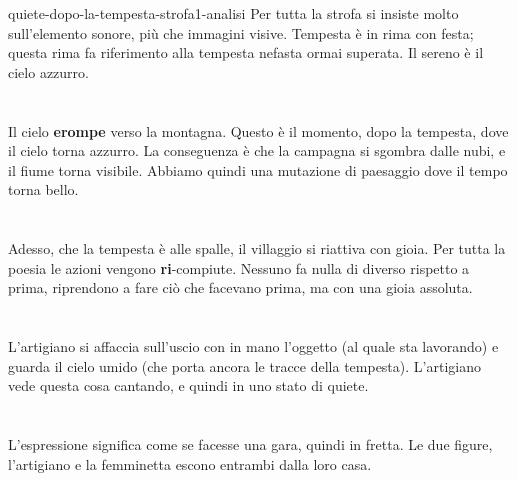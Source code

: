 \documentclass[preview]{standalone}
\begin{document}
\begin{snippet}{quiete-dopo-la-tempesta-strofa1-analisi}
    Per tutta la strofa si insiste molto sull'elemento sonore, più che immagini visive.
    Tempesta è in rima con festa; questa rima fa riferimento alla tempesta nefasta ormai superata.
    Il sereno è il cielo azzurro.
    \\\\
    \\
    Il cielo \textbf{erompe} verso la montagna.
    Questo è il momento, dopo la tempesta, dove il cielo torna azzurro.
    La conseguenza è che la campagna si sgombra dalle nubi, e il fiume torna visibile.
    Abbiamo quindi una mutazione di paesaggio dove il tempo torna bello.
    \\\\
    \\
    Adesso, che la tempesta è alle spalle, il villaggio si riattiva con gioia.
    Per tutta la poesia le azioni vengono \textbf{ri}-compiute.
    Nessuno fa nulla di diverso rispetto a prima, riprendono a fare ciò che facevano prima,
    ma con una gioia assoluta.
    \\\\
    \\
    L'artigiano si affaccia sull'uscio con in mano l'oggetto (al quale sta lavorando)
    e guarda il cielo umido (che porta ancora le tracce della tempesta).
    L'artigiano vede questa cosa cantando, e quindi in uno stato di quiete.
    \\\\
    \\
    L'espressione  significa come se facesse una gara, quindi in fretta.
    Le due figure, l'artigiano e la femminetta escono entrambi dalla loro casa.

\end{snippet}
\end{document}
